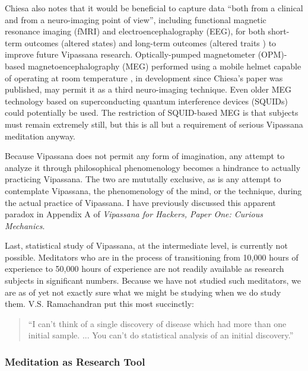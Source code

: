 \documentclass[a4paper, amsfonts, amssymb, amsmath, reprint, showkeys, nofootinbib, twoside]{revtex4-1}
\begin{document}
Chiesa also notes that it would be beneficial to capture data
``both from a clinical and from a neuro-imaging point of view'',
including functional magnetic resonance imaging (fMRI)
and electroencephalography (EEG), for both short-term outcomes
(altered states) and long-term outcomes (altered traits \cite{davidson1977role}) to
improve future Vipassana research. \cite{chiesa2010vipassana}
Optically-pumped magnetometer (OPM)-based magnetoencephalography (MEG) performed using a
mobile helmet capable of operating at room temperature \cite{boto2017new},
in development since Chiesa's
paper was published, may permit it as a third neuro-imaging technique. Even older MEG
technology based on superconducting quantum interference devices (SQUIDs) could
potentially be used. The restriction of SQUID-based MEG is that subjects must remain
extremely still, but this is all but a requirement of serious Vipassana meditation
anyway.

Because Vipassana does not permit any form of imagination, any attempt to analyze it
through philosophical phenomenology becomes a hindrance to actually practicing
Vipassana. \cite{patrik1994phenomenological} The two are mututally exclusive, as is
any attempt to contemplate Vipassana, the phenomenology of the mind, or the
technique, during the actual practice of Vipassana. I have previously discussed this
apparent paradox in Appendix A of
\textit{Vipassana for Hackers, Paper One: Curious Mechanics}.
\cite{deobald2017curious}

Last, statistical study of Vipassana, at the intermediate level, is currently not
possible. Meditators who are in the process of transitioning from 10,000 hours of
experience to 50,000 hours of experience are not readily available as research
subjects in significant numbers. Because we have not studied such meditators, we are
as of yet not exactly sure what we might be studying when we do study
them. V.S. Ramachandran put this most succinctly:

\begin{quotation}
  ``I can't think of a single discovery of disease which had more than one initial
  sample. ... You can't do statistical analysis of an initial discovery.''
  \cite{ramachandran2019relevance}
\end{quotation}

\subsubsection{Meditation as Research Tool}
\end{document}
